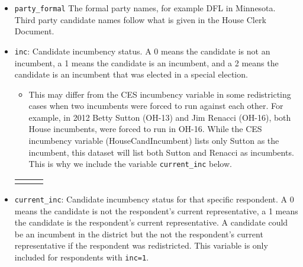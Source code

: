 \documentclass[12pt]{article}
\begin{document}
\begin{itemize}[leftmargin=*]


\begin{tabularx}{\linewidth}{C}
  
\end{tabularx}

\item \texttt{party\_formal} The formal party names, for example DFL in Minnesota. Third party candidate names follow what is given in the House Clerk Document. 

\item \texttt{inc}: Candidate incumbency status. A 0 means the candidate is not an incumbent, a 1 means the candidate is an incumbent, and a 2 means the candidate is an incumbent that was elected in a special election. 
\begin{itemize}
\item This may differ from the CES incumbency variable in some redistricting cases when two incumbents were forced to run against each other. For example, in 2012 Betty Sutton (OH-13) and Jim Renacci (OH-16), both House incumbents, were forced to run in OH-16. While the CES incumbency variable (HouseCandIncumbent) lists only Sutton as the incumbent, this dataset will list both Sutton and Renacci as incumbents. This is why we include the variable  \texttt{current\_inc} below.  
\end{itemize}

    \begin{tabularx}{\linewidth}{CCC}
     &  & 
    \end{tabularx}

\item \texttt{current\_inc}: Candidate incumbency status for that specific respondent. A 0 means the candidate is not the respondent's current representative, a 1 means the candidate is the respondent's current representative. A candidate could be an incumbent in the district but the not the respondent's current representative if the respondent was redistricted. This variable is only included for respondents with \texttt{inc=1}.

			
			

\end{itemize}
\end{document}
